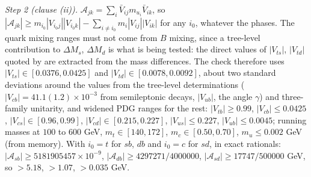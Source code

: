 \emph{Step 2 (clause (ii)).} $\mathcal{A}_{jk} = \sum_{i}\bar{V}_{ij}m_{u_{i}}\bar{V}_{ik}$, so $|\mathcal{A}_{jk}| \ge m_{i_{0}}|V_{i_{0}j}||V_{i_{0}k}| - \sum_{i \ne i_{0}}m_{i}|V_{ij}||V_{ik}|$ for any $i_{0}$, whatever the phases. The quark mixing ranges must not come from $B$ mixing, since a tree-level contribution to $\Delta M_{s}$, $\Delta M_{d}$ is what is being tested: the direct values of $|V_{ts}|$, $|V_{td}|$ quoted by \cite{PDG2025} are extracted from the mass differences. The check therefore uses $|V_{ts}| \in [0.0376, 0.0425]$ and $|V_{td}| \in [0.0078, 0.0092]$, about two standard deviations around the values from the tree-level determinations ($|V_{cb}| = 41.1(1.2) \times 10^{-3}$ from semileptonic decays, $|V_{ub}|$, the angle $\gamma$) and three-family unitarity, and widened PDG ranges for the rest: $|V_{tb}| \ge 0.99$, $|V_{cb}| \le 0.0425$, $|V_{cs}| \in [0.96, 0.99]$, $|V_{cd}| \in [0.215, 0.227]$, $|V_{us}| \le 0.227$, $|V_{ub}| \le 0.0045$; running masses at $100$ to $600$ GeV, $m_{t} \in [140, 172]$, $m_{c} \in [0.50, 0.70]$, $m_{u} \le 0.002$ GeV (from memory). With $i_{0} = t$ for $sb$, $db$ and $i_{0} = c$ for $sd$, in exact rationals: $|\mathcal{A}_{sb}| \ge 5181905457 \times 10^{-9}$, $|\mathcal{A}_{db}| \ge 4297271/4000000$, $|\mathcal{A}_{sd}| \ge 17747/500000$ GeV, so $> 5.18$, $> 1.07$, $> 0.035$ GeV.

